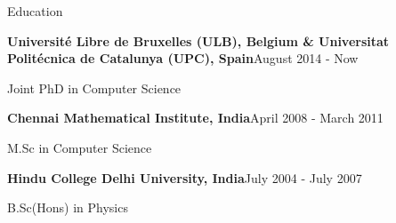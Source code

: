 \documentclass{resume} %
\begin{document}


\begin{rSection}{Education}
\begin{rSubsection}{\bf Universit\'{e} Libre de Bruxelles (ULB), Belgium \&  Universitat Polit\'{e}cnica de Catalunya (UPC), Spain}{August 2014 - Now}{}{}  
\item Joint PhD in Computer Science 
\end{rSubsection}
\begin{rSubsection}{\bf Chennai Mathematical Institute, India}{April 2008 - March 2011}{}{}  
\item M.Sc in Computer Science 
\end{rSubsection}

\begin{rSubsection}{\bf Hindu College Delhi University, India}{July 2004 - July 2007}{}{}  
\item B.Sc(Hons) in Physics
\end{rSubsection}
\end{rSection}
\end{document}
